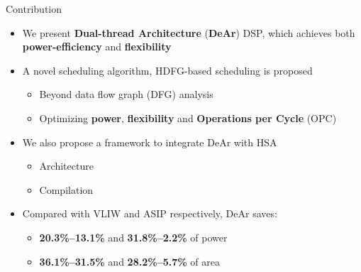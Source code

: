 \documentclass{beamer}
\begin{document}
\begin{CJK}{UTF8}{bkai}
    \begin{frame}{Contribution}
        \begin{itemize}
            \item <2->{
                    We present \textbf{Dual-thread Architecture} (\textbf{DeAr}) DSP, which achieves both \textbf{power-efficiency} and \textbf{flexibility}
                }
            \item <3->{
                    A novel scheduling algorithm, HDFG-based scheduling is proposed
                    \begin{itemize}
                        \item Beyond data flow graph (DFG) analysis
                        \item Optimizing \textbf{power}, \textbf{flexibility} and \textbf{Operations per Cycle} (OPC)
                    \end{itemize}
                }
            \item <4->{
                    We also propose a framework to integrate DeAr with HSA
                    \begin{itemize}
                        \item {
                                Architecture
                            }
                        \item {
                                Compilation
                            }
                    \end{itemize}
                }
            \item <5->{
                    Compared with VLIW and ASIP respectively, DeAr saves: 
                    \begin{itemize}
                        \item {
                                \textbf{20.3\%--13.1\%} and \textbf{31.8\%--2.2\%} of power
                                }
                            \item {
                                    \textbf{36.1\%--31.5\%} and \textbf{28.2\%--5.7\%} of area
                                    }
                            \end{itemize}
                        }
                \end{itemize}
            \end{frame}


\end{CJK}
\end{document}
